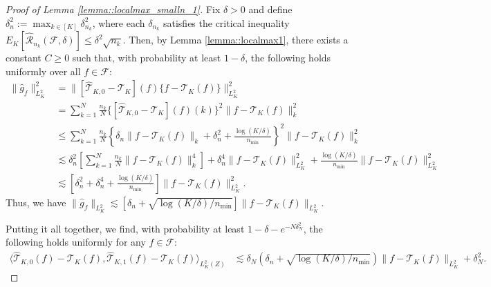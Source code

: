 \documentclass[11pt]{article}
\theoremstyle{plain}
\theoremstyle{definition}
\theoremstyle{remark}
\theoremstyle{definition}
\begin{document}
\begin{proof}[Proof of Lemma \ref{lemma::localmax_smalln_1}]
Fix $\delta > 0$  and define $\delta_n^2 := \max_{k \in [K]} \delta_{n_k}^2$, where each $\delta_{n_k}$ satisfies the critical inequality $E_K[\widehat{\mathcal{R}}_{n_k}(\mathcal{F}, \delta)] \leq \delta^2\sqrt{n_k}$. Then, by Lemma \ref{lemma::localmax1}, there exists a constant $C \geq 0$ such that, with probability at least $1 -\delta$, the following holds uniformly over all $f \in \mathcal{F}$:
\begin{align*}
  \|\widehat{g}_f \|_{L^2_K}^2 &= \|[\widehat{\mathcal{T}}_{K,0} - \mathcal{T}_{K}](f) \{f - \mathcal{T}_{K}(f)\}\|_{L^2_K}^2 \\
  &= \sum_{k=1}^N \frac{n_k}{N} \{[\widehat{\mathcal{T}}_{K,0} - \mathcal{T}_{K}](f)(k)\}^2 \|f - \mathcal{T}_{K}(f)\|_k^2\\
  &\leq \sum_{k=1}^N \frac{n_k}{N} \left\{ \delta_{n}  \|f - \mathcal{T}_{K}(f)\|_k + \delta_{n}^2 + \frac{\log(K/\delta)}{n_{\min}}\right\}^2 \|f - \mathcal{T}_{K}(f)\|_k^2\\
  &\lesssim \delta_{n}^2  \left[ \sum_{k=1}^N \frac{n_k}{N}  \|f - \mathcal{T}_{K}(f)\|_k^4\right] + \delta_{n}^4 \|f - \mathcal{T}_{K}(f)\|_{L^2_K}^2 + \frac{\log(K/\delta)}{n_{\min}}  \|f - \mathcal{T}_{K}(f)\|_{L^2_K}^2\\
    & \lesssim \left[\delta_n^2  + \delta_{n}^4 + \frac{\log(K/\delta)}{n_{\min}} \right] \|f - \mathcal{T}_{K}(f)\|_{L^2_K}^2.
\end{align*}
Thus, we have $\|\widehat{g}_f \|_{L^2_K} \lesssim  [\delta_n  + \sqrt{\log(K/\delta) / n_{\min}} ] \|f - \mathcal{T}_{K}(f)\|_{L^2_K}$.



 Putting it all together, we find, with probability at least $1 - \delta -  e^{-N\delta_N^2} $, the following holds uniformly for any $f \in \mathcal{F}$:
\begin{align*}
 \langle  \widehat{\mathcal{T}}_{K,0}(f) - \mathcal{T}_{K}(f), \widehat{\mathcal{T}}_{K,1}(f) - \mathcal{T}_{K}(f) \rangle_{L^2_K(Z)} &\lesssim   \delta_N\left( \delta_n +  \sqrt{\log(K/\delta) / n_{\min}} \right)  \|f - \mathcal{T}_{K}(f)\|_{L^2_K}   + \delta_N^2.
\end{align*}
 \end{proof}
\end{document}
